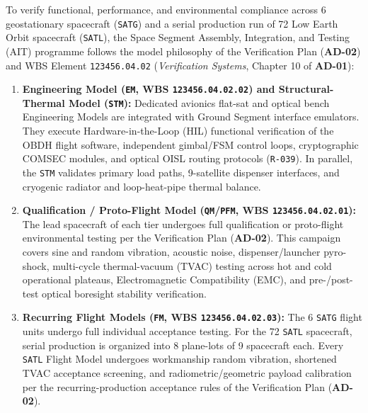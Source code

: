 \documentclass[11pt,a4paper]{article}
\providecommand{\abbr}[1]{#1}
\begin{document}
To verify functional, performance, and environmental compliance across 6 geostationary spacecraft (\texttt{SATG}) and a serial production run of 72 Low Earth Orbit spacecraft (\texttt{SATL}), the Space Segment Assembly, Integration, and Testing (\abbr{AIT}) programme follows the model philosophy of the Verification Plan (\textbf{AD-02}) and \abbr{WBS} Element \texttt{123456.04.02} (\emph{Verification Systems}, Chapter 10 of \textbf{AD-01}):
\begin{enumerate}
    \item \textbf{Engineering Model (\texttt{EM}, \abbr{WBS} \texttt{123456.04.02.02}) and Structural-Thermal Model (\texttt{STM}):} Dedicated avionics flat-sat and optical bench Engineering Models are integrated with Ground Segment interface emulators. They execute Hardware-in-the-Loop (\abbr{HIL}) functional verification of the \abbr{OBDH} flight software, independent gimbal/\abbr{FSM} control loops, cryptographic \abbr{COMSEC} modules, and optical \abbr{OISL} routing protocols (\texttt{R-039}). In parallel, the \texttt{STM} validates primary load paths, 9-satellite dispenser interfaces, and cryogenic radiator and loop-heat-pipe thermal balance.
    \item \textbf{Qualification / Proto-Flight Model (\texttt{QM}/\texttt{PFM}, \abbr{WBS} \texttt{123456.04.02.01}):} The lead spacecraft of each tier undergoes full qualification or proto-flight environmental testing per the Verification Plan (\textbf{AD-02}). This campaign covers sine and random vibration, acoustic noise, dispenser/launcher pyro-shock, multi-cycle thermal-vacuum (\abbr{TVAC}) testing across hot and cold operational plateaus, Electromagnetic Compatibility (\abbr{EMC}), and pre-/post-test optical boresight stability verification.
    \item \textbf{Recurring Flight Models (\texttt{FM}, \abbr{WBS} \texttt{123456.04.02.03}):} The 6 \texttt{SATG} flight units undergo full individual acceptance testing. For the 72 \texttt{SATL} spacecraft, serial production is organized into 8 plane-lots of 9 spacecraft each. Every \texttt{SATL} Flight Model undergoes workmanship random vibration, shortened \abbr{TVAC} acceptance screening, and radiometric/geometric payload calibration per the recurring-production acceptance rules of the Verification Plan (\textbf{AD-02}).
\end{enumerate}
\end{document}
